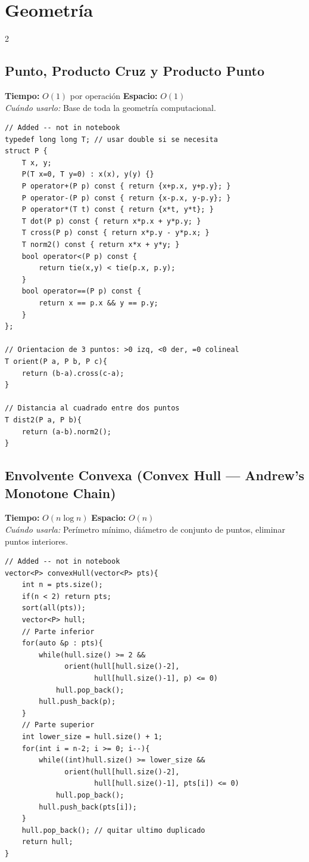 \documentclass[10pt,a4paper]{article}
\begin{document}
\section{Geometr\'ia}
\begin{multicols}{2}

\subsection{Punto, Producto Cruz y Producto Punto}
\textbf{Tiempo:} $O(1)$ por operaci\'on \quad \textbf{Espacio:} $O(1)$\\
\textit{Cu\'ando usarlo:} Base de toda la geometr\'ia computacional.

\begin{lstlisting}
// Added -- not in notebook
typedef long long T; // usar double si se necesita
struct P {
    T x, y;
    P(T x=0, T y=0) : x(x), y(y) {}
    P operator+(P p) const { return {x+p.x, y+p.y}; }
    P operator-(P p) const { return {x-p.x, y-p.y}; }
    P operator*(T t) const { return {x*t, y*t}; }
    T dot(P p) const { return x*p.x + y*p.y; }
    T cross(P p) const { return x*p.y - y*p.x; }
    T norm2() const { return x*x + y*y; }
    bool operator<(P p) const {
        return tie(x,y) < tie(p.x, p.y);
    }
    bool operator==(P p) const {
        return x == p.x && y == p.y;
    }
};

// Orientacion de 3 puntos: >0 izq, <0 der, =0 colineal
T orient(P a, P b, P c){
    return (b-a).cross(c-a);
}

// Distancia al cuadrado entre dos puntos
T dist2(P a, P b){
    return (a-b).norm2();
}
\end{lstlisting}

\subsection{Envolvente Convexa (Convex Hull --- Andrew's Monotone Chain)}
\textbf{Tiempo:} $O(n \log n)$ \quad \textbf{Espacio:} $O(n)$\\
\textit{Cu\'ando usarla:} Per\'imetro m\'inimo, di\'ametro de conjunto de puntos, eliminar puntos interiores.

\begin{lstlisting}
// Added -- not in notebook
vector<P> convexHull(vector<P> pts){
    int n = pts.size();
    if(n < 2) return pts;
    sort(all(pts));
    vector<P> hull;
    // Parte inferior
    for(auto &p : pts){
        while(hull.size() >= 2 &&
              orient(hull[hull.size()-2],
                     hull[hull.size()-1], p) <= 0)
            hull.pop_back();
        hull.push_back(p);
    }
    // Parte superior
    int lower_size = hull.size() + 1;
    for(int i = n-2; i >= 0; i--){
        while((int)hull.size() >= lower_size &&
              orient(hull[hull.size()-2],
                     hull[hull.size()-1], pts[i]) <= 0)
            hull.pop_back();
        hull.push_back(pts[i]);
    }
    hull.pop_back(); // quitar ultimo duplicado
    return hull;
}


\end{lstlisting}
\end{multicols}
\end{document}
